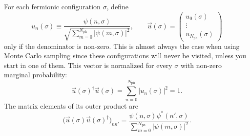 \documentclass[../../main.tex]{subfiles}
\begin{document}
For each fermionic configuration $\sigma$, define
\begin{equation}
u_n(\sigma)\equiv
\frac{\psi(n,\sigma)}
{\sqrt{\sum_{m=0}^{N_{\mathrm{ph}}}|\psi(m,\sigma)|^2}},
\qquad
\vec u(\sigma)=
\begin{pmatrix}
u_0(\sigma)\\
\vdots\\
u_{N_{\mathrm{ph}}}(\sigma)
\end{pmatrix}
\end{equation}
only if the denominator is non-zero. This is almost always the case when using Monte Carlo sampling since these configurations will never be visited, unless you start in one of them.
This vector is normalized for every $\sigma$ with non-zero marginal
probability:
\begin{equation}
\vec u(\sigma)^\dagger\vec u(\sigma)
=\sum_{n=0}^{N_{\mathrm{ph}}}|u_n(\sigma)|^2=1.
\end{equation}
The matrix elements of its outer product are
\begin{equation}
\bigl(\vec u(\sigma)\vec u(\sigma)^\dagger\bigr)_{nn'}
=
\frac{\psi(n,\sigma)\psi^*(n',\sigma)}
{\sum_{m=0}^{N_{\mathrm{ph}}}|\psi(m,\sigma)|^2}.
\end{equation}
\end{document}
